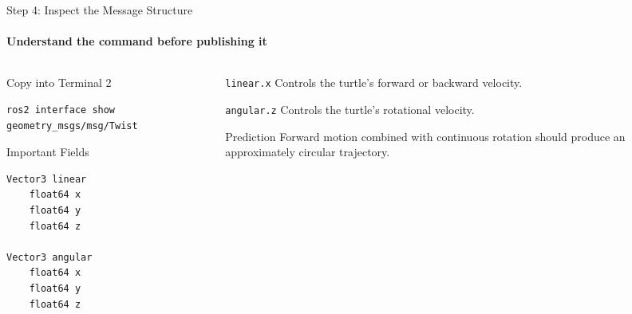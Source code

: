 \begin{frame}[fragile]{Step 4: Inspect the Message Structure}
\framesubtitle{Understand the command before publishing it}

\footnotesize

\begin{columns}[T,onlytextwidth]

    \begin{column}{0.48\textwidth}
        \begin{block}{Copy into Terminal 2}
\begin{verbatim}
ros2 interface show geometry_msgs/msg/Twist
\end{verbatim}
        \end{block}

        \begin{exampleblock}{Important Fields}
\begin{verbatim}
Vector3 linear
    float64 x
    float64 y
    float64 z

Vector3 angular
    float64 x
    float64 y
    float64 z
\end{verbatim}
        \end{exampleblock}
    \end{column}

    \begin{column}{0.48\textwidth}
        \begin{block}{\texttt{linear.x}}
            Controls the turtle's forward or backward velocity.
        \end{block}
        
        \begin{block}{\texttt{angular.z}}
            Controls the turtle's rotational velocity.
        \end{block}

        \vspace{0.15cm}

        \begin{alertblock}{Prediction}
            Forward motion combined with continuous rotation should produce
            an approximately circular trajectory.
        \end{alertblock}
    \end{column}

\end{columns}

\end{frame}

